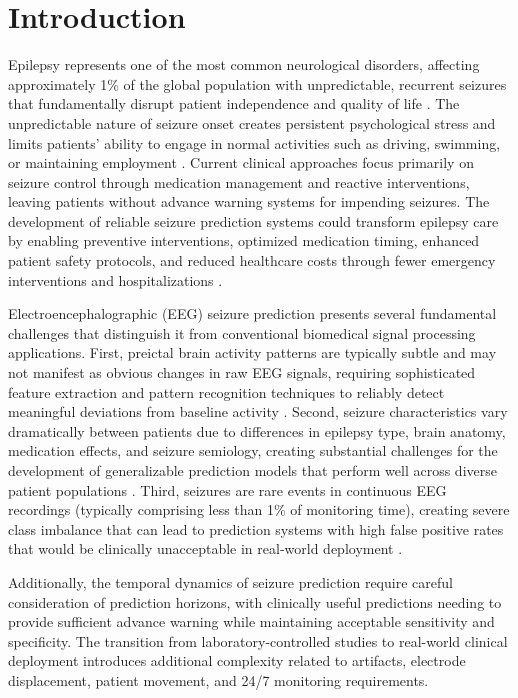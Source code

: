 \documentclass[conference]{IEEEtran}
\begin{document}
\section{Introduction}
Epilepsy represents one of the most common neurological disorders, affecting approximately 1\% of the global population with unpredictable, recurrent seizures that fundamentally disrupt patient independence and quality of life \cite{b1}. The unpredictable nature of seizure onset creates persistent psychological stress and limits patients' ability to engage in normal activities such as driving, swimming, or maintaining employment \cite{b2}. Current clinical approaches focus primarily on seizure control through medication management and reactive interventions, leaving patients without advance warning systems for impending seizures. The development of reliable seizure prediction systems could transform epilepsy care by enabling preventive interventions, optimized medication timing, enhanced patient safety protocols, and reduced healthcare costs through fewer emergency interventions and hospitalizations \cite{b3}.

Electroencephalographic (EEG) seizure prediction presents several fundamental challenges that distinguish it from conventional biomedical signal processing applications. First, preictal brain activity patterns are typically subtle and may not manifest as obvious changes in raw EEG signals, requiring sophisticated feature extraction and pattern recognition techniques to reliably detect meaningful deviations from baseline activity \cite{b4}. Second, seizure characteristics vary dramatically between patients due to differences in epilepsy type, brain anatomy, medication effects, and seizure semiology, creating substantial challenges for the development of generalizable prediction models that perform well across diverse patient populations \cite{b5}. Third, seizures are rare events in continuous EEG recordings (typically comprising less than 1\% of monitoring time), creating severe class imbalance that can lead to prediction systems with high false positive rates that would be clinically unacceptable in real-world deployment \cite{b6}.

Additionally, the temporal dynamics of seizure prediction require careful consideration of prediction horizons, with clinically useful predictions needing to provide sufficient advance warning while maintaining acceptable sensitivity and specificity. The transition from laboratory-controlled studies to real-world clinical deployment introduces additional complexity related to artifacts, electrode displacement, patient movement, and 24/7 monitoring requirements.
\end{document}
